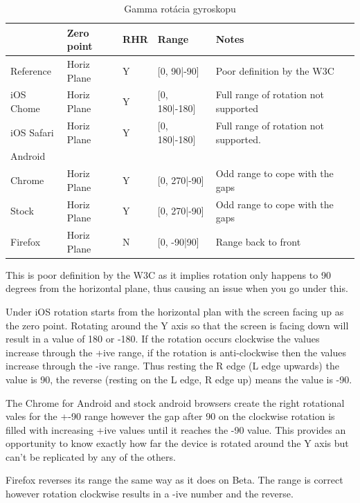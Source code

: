 \begin{table}[H]
  \begin{tabular}{ | l | l | l | l | l |}
  \hline
              & Zero point    & RHR   & Range         & Notes\\ \hline
  Reference   & Horiz Plane   & Y     & [0, 90|-90]   & Poor definition by the W3C \\  
  iOS Chome   & Horiz Plane   & Y     & [0, 180|-180] & Full range of rotation not supported \\  
  iOS Safari  & Horiz Plane   & Y     & [0, 180|-180] & Full range of rotation not supported. \\  
  Android & & & & \\  
  Chrome      & Horiz Plane   & Y     & [0, 270|-90]  & Odd range to cope with the gaps \\  
  Stock       & Horiz Plane   & Y     & [0, 270|-90]  & Odd range to cope with the gaps \\  
  Firefox     & Horiz Plane   & N     & [0, -90|90]   & Range back to front \\
  \hline
  \end{tabular}
  \caption[Gamma rotácia gyroskopu]{Gamma rotácia gyroskopu}
\end{table}

This is poor definition by the W3C as it implies rotation only happens to 90 degrees from the horizontal plane, thus causing an issue when you go under this.

Under iOS rotation starts from the horizontal plan with the screen facing up as the zero point. Rotating around the Y axis so that the screen is facing down will result in a value of 180 or -180. If the rotation occurs clockwise the values increase through the +ive range, if the rotation is anti-clockwise then the values increase through the -ive range. Thus resting the R edge (L edge upwards) the value is 90, the reverse (resting on the L edge, R edge up) means the value is -90.

The Chrome for Android and stock android browsers create the right rotational vales for the +-90 range however the gap after 90 on the clockwise rotation is filled with increasing +ive values until it reaches the -90 value. This provides an opportunity to know exactly how far the device is rotated around the Y axis but can't be replicated by any of the others.

Firefox reverses its range the same way as it does on Beta. The range is correct however rotation clockwise results in a -ive number and the reverse.



